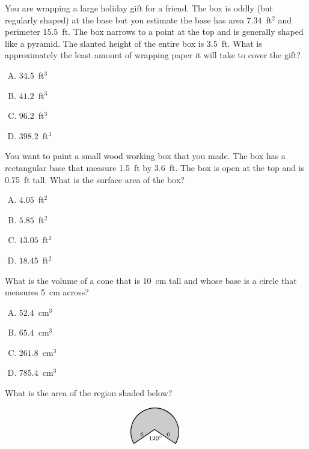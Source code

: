 \documentclass[12pt,letterpaper]{exam}
\begin{document}
\begin{questions}
\question You are wrapping a large holiday gift for a friend. The box is oddly (but regularly shaped) at the base but you estimate the base has area $7.34$~ft$^2$ and perimeter $15.5$~ft. The box narrows to a point at the top and is generally shaped like a pyramid. The slanted height of the entire box is $3.5$~ft. What is approximately the least amount of wrapping paper it will take to cover the gift?
        \begin{enumerate}[A.]
        \item $34.5$~ft$^3$
        \item $41.2$~ft$^3$
        \item $96.2$~ft$^3$ 
        \item $398.2$~ft$^3$
        \end{enumerate}



\vfill



\question You want to paint a small wood working box that you made. The box has a rectangular base that measure 1.5~ft by 3.6~ft. The box is open at the top and is 0.75~ft tall. What is the surface area of the box?
        \begin{enumerate}[A.]
        \item $4.05$~ft$^2$
        \item $5.85$~ft$^2$
        \item $13.05$~ft$^2$
        \item $18.45$~ft$^2$ 
        \end{enumerate}



\vfill



\question What is the volume of a cone that is 10~cm tall and whose base is a circle that measures 5~cm across?
        \begin{enumerate}[A.]
        \item $52.4$~cm$^3$
        \item $65.4$~cm$^3$ 
        \item $261.8$~cm$^3$
        \item $785.4$~cm$^3$
        \end{enumerate}



\vfill



\question What is the area of the region shaded below?
	\[
	\begin{tikzpicture}
	\draw[line width=0.03cm,fill=gray!40] (0,0) arc (-30:210:1);
	\draw[line width=0.03cm,fill=white,white] (-1.75,0) -- (-0.875,0.6) -- (0.017,0) -- (-1.75,0);
	\draw[line width=0.03cm] (-1.75,0) -- (-0.875,0.6) -- (0.017,0);
	\node at (-0.3,0.4) {\scriptsize$6$};
	\node at (-1.4,0.4) {\scriptsize$6$};
	\node at (-0.83,0.25) {\scriptsize$120^\circ$};
	\end{tikzpicture}
	\]


\end{questions}
\end{document}
